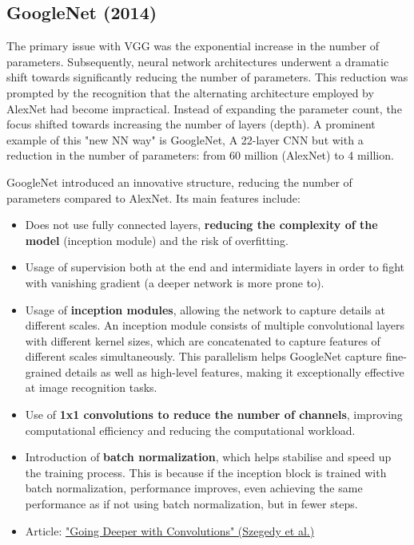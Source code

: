 \subsection{GoogleNet (2014)}
The primary issue with VGG was the exponential increase in the number of parameters. Subsequently, neural network architectures underwent a dramatic shift towards significantly reducing the number of parameters. This reduction was prompted by the recognition that the alternating architecture employed by AlexNet had become impractical. Instead of expanding the parameter count, the focus shifted towards increasing the number of layers (depth). A prominent example of this "new NN way" is GoogleNet, A 22-layer CNN but with a reduction in the number of parameters: from 60 million (AlexNet) to 4 million.

GoogleNet introduced an innovative structure, reducing the number of parameters compared to AlexNet. Its main features include:
\begin{itemize}
    \item Does not use fully connected layers, \textbf{reducing the complexity of the model} (inception module) and the risk of overfitting.
    \item Usage of supervision both at the end and intermidiate layers in order to fight with vanishing gradient (a deeper network is more prone to). 
    \item Usage of \textbf{inception modules}, allowing the network to capture details at different scales. An inception module consists of multiple convolutional layers with different kernel sizes, which are concatenated to capture features of different scales simultaneously. This parallelism helps GoogleNet capture fine-grained details as well as high-level features, making it exceptionally effective at image recognition tasks.
    \item Use of \textbf{1x1 convolutions to reduce the number of channels}, improving computational efficiency and reducing the computational workload.
    \item Introduction of \textbf{batch normalization}, which helps stabilise and speed up the training process. This is because if the inception block is trained with batch normalization, performance improves, even achieving the same performance as if not using batch normalization, but in fewer steps.
    \item Article: \href{https://arxiv.org/pdf/1409.4842.pdf}{"Going Deeper with Convolutions" (Szegedy et al.)}
\end{itemize}


